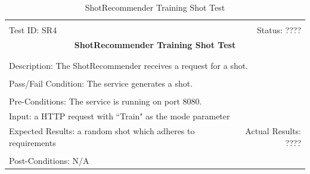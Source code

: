 \documentclass[11pt]{article}
\begin{document}
\begin{center}
\begin{table}[H]
\begin{tabular}{|l r|}\hline&\\[-2mm]
	Test ID: SR4	&Status: ????\\[-3mm]
	\multicolumn{2}{|c|}{\textbf{\large{ShotRecommender Training Shot Test}}}\\&\\\hline&\\[-3mm]
	\multicolumn{2}{|p{\textwidth}|}{Description: The ShotRecommender receives a request for a shot.}\\[1mm]\hline&\\[-3mm]
	\multicolumn{2}{|p{\textwidth}|}{Pass/Fail Condition: The service generates a shot.}\\[1mm]\hline&\\[-3mm]
	\multicolumn{2}{|p{\textwidth}|}{Pre-Conditions: The service is running on port 8080.}\\[4mm]
	\multicolumn{2}{|p{\textwidth}|}{Input: a HTTP request with ``Train" as the mode parameter}\\[2mm]\hline
	\multicolumn{1}{|p{0.49\textwidth}}{Expected Results: a random shot which adheres to requirements}	&\multicolumn{1}{|p{0.45\textwidth}|}{Actual Results: ????}\\\hline&\\[-3mm]
	\multicolumn{2}{|p{\textwidth}|}{Post-Conditions: N/A}\\\hline
\end{tabular}
\caption{ShotRecommender Training Shot Test}
\end{table}
\end{center}
\end{document}
